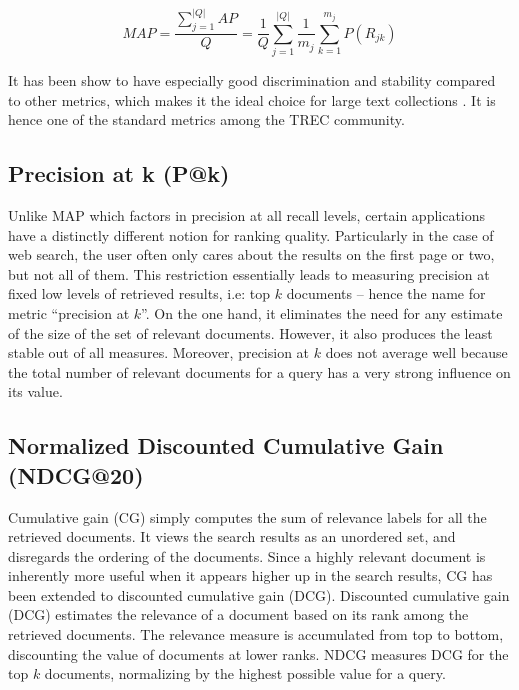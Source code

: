 \begin{equation}
MAP = \frac{\sum^{|Q|} _{j = 1} AP}{Q} = \frac{1}{Q} \sum^{|Q|} _{j = 1} \frac{1}{m_j} \sum^{m_j} _{k = 1} P(R_{jk})
\end{equation}


It has been show to have especially good discrimination and stability compared to other metrics, which makes it the ideal choice for large text collections \cite{manning2010introduction}.
It is hence one of the standard metrics among the TREC community.

\subsection{Precision at k (P@k)}

Unlike MAP which factors in precision at all recall levels, certain applications have a distinctly different notion for ranking quality.
Particularly in the case of web search, the user often only cares about the results on the first page or two, but not all of them.
This restriction essentially leads to measuring precision at fixed low levels of retrieved results, i.e: top $ k $ documents -- hence the name for metric ``precision at $ k $''.
On the one hand, it eliminates the need for any estimate of the size of the set of relevant documents.
However, it also produces the least stable out of all measures.
Moreover, precision at $ k $ does not average well because the total number of relevant documents for a query has a very strong influence on its value. 

\subsection{Normalized Discounted Cumulative Gain (NDCG@20)}

Cumulative gain (CG) simply computes the sum of relevance labels for all the retrieved documents.
It views the search results as an unordered set, and disregards the ordering of the documents.
Since a highly relevant document is inherently more useful when it appears higher up in the search results, CG has been extended to discounted cumulative gain (DCG).
Discounted cumulative gain (DCG) estimates the relevance of a document based on its rank among the retrieved documents.
The relevance measure is accumulated from top to bottom, discounting the value of documents at lower ranks.
NDCG measures DCG for the top $ k $ documents, normalizing by the highest possible value for a query.

